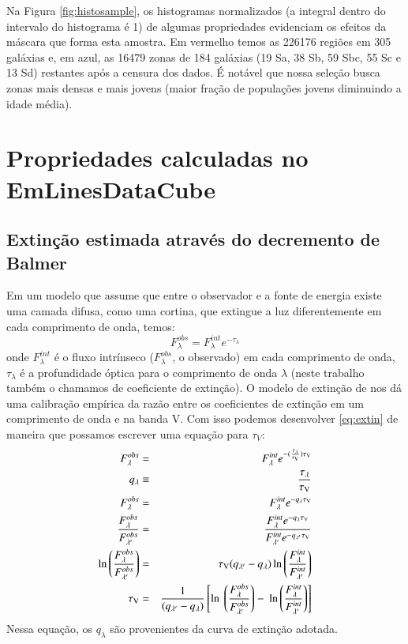 Na Figura \ref{fig:histosample}, os histogramas normalizados (a integral dentro do intervalo do histograma é 1) de algumas propriedades evidenciam os efeitos da máscara que forma esta amostra. Em vermelho temos as 226176 regiões em 305 galáxias e, em azul, as 16479 zonas de 184 galáxias (19 Sa, 38 Sb, 59 Sbc, 55 Sc e 13 Sd) restantes após a censura dos dados. É notável que nossa seleção busca zonas mais densas e mais jovens (maior fração de populações jovens diminuindo a idade média).


\section{Propriedades calculadas no EmLinesDataCube}
\label{apendice:EmLinesDataCube:props}

\subsection{Extinção estimada através do decremento de Balmer}
\label{apendice:EmLinesDataCube:props:tauvneb}
Em um modelo que assume que entre o observador e a fonte de energia existe uma camada difusa, como uma cortina, que extingue a luz diferentemente em cada comprimento de onda, temos:
\begin{equation}
	F_\lambda^{obs} = F_\lambda^{int} e^{-\tau_\lambda}
    \label{eq:extin}
\end{equation}
\noindent onde $F_\lambda^{int}$ é o fluxo intrínseco ($F_\lambda^{obs}$, o observado) em cada comprimento de onda, $\tau_\lambda$ é a profundidade óptica para o comprimento de onda $\lambda$ (neste trabalho também o chamamos de coeficiente de extinção). O modelo de extinção de \citet{CCM1989a} nos dá uma calibração empírica da razão entre os coeficientes de extinção em um comprimento de onda e na banda V. Com isso podemos desenvolver \eqref{eq:extin} de maneira que possamos escrever uma equação para $\tau_V$:
\begin{eqnarray}
   F_\lambda^{obs} &=& F_\lambda^{int} e^{-(\frac{\tau_\lambda}{\tau_{\mathrm{V}}}) \tau_{\mathrm{V}}} \\
   q_\lambda &\equiv& \frac{\tau_\lambda}{\tau_{\mathrm{V}}} \\
   F_\lambda^{obs} &=& F_\lambda^{int} e^{-q_\lambda \tau_{\mathrm{V}}} \\
   \frac{F_\lambda^{obs}}{F_{\lambda^\prime}^{obs}} &=& \
 \frac{F_\lambda^{int} e^{-q_\lambda \tau_{\mathrm{V}}}}{F_{\lambda^\prime}^{int} e^{-q_{\lambda^\prime} \tau_{\mathrm{V}}}} \\
   \ln \left(\frac{F_\lambda^{obs}}{F_{\lambda^\prime}^{obs}}\right) &=& \
 \tau_{\mathrm{V}} (q_{\lambda^\prime} - q_\lambda) \ln \left(\frac{F_\lambda^{int}}{F_{\lambda^\prime}^{int}}\right) \\
   \tau_{\mathrm{V}} &=& \frac{1}{(q_{\lambda^\prime} - q_\lambda)} \left[\ln \
 \left(\frac{F_\lambda^{obs}}{F_{\lambda^\prime}^{obs}}\right) - \
 \ln \left(\frac{F_\lambda^{int}}{F_{\lambda^\prime}^{int}}\right)\right]
 \label{eq:tauV}
\end{eqnarray}
\noindent Nessa equação, os $q_\lambda$ são provenientes da curva de extinção adotada.

